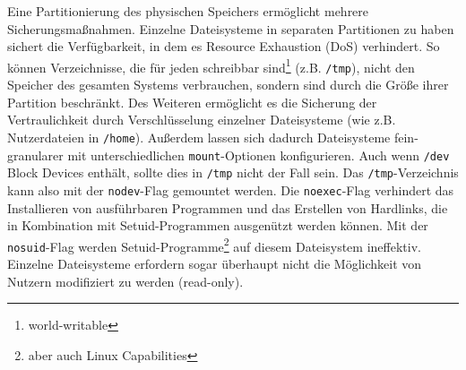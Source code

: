 Eine Partitionierung des physischen Speichers ermöglicht mehrere Sicherungsmaßnahmen.
Einzelne Dateisysteme in separaten Partitionen zu haben sichert die Verfügbarkeit, in dem es Resource Exhaustion (DoS) verhindert. So können Verzeichnisse, die für jeden schreibbar sind\footnote{world-writable} (z.B. \texttt{/tmp}), nicht den Speicher des gesamten Systems verbrauchen, sondern sind durch die Größe ihrer Partition beschränkt.
Des Weiteren ermöglicht es die Sicherung der Vertraulichkeit durch Verschlüsselung einzelner Dateisysteme (wie z.B. Nutzerdateien in \texttt{/home}).
Außerdem lassen sich dadurch Dateisysteme fein-granularer mit unterschiedlichen \texttt{mount}-Optionen konfigurieren. Auch wenn \texttt{/dev} Block Devices enthält, sollte dies in \texttt{/tmp} nicht der Fall sein. Das \texttt{/tmp}-Verzeichnis kann also mit der \texttt{nodev}-Flag gemountet werden. Die \texttt{noexec}-Flag verhindert das Installieren von ausführbaren Programmen und das Erstellen von Hardlinks, die in Kombination mit Setuid-Programmen ausgenützt werden können. Mit
der \texttt{nosuid}-Flag werden Setuid-Programme\footnote{aber auch Linux Capabilities} auf diesem Dateisystem ineffektiv. Einzelne Dateisysteme erfordern sogar überhaupt nicht die Möglichkeit von Nutzern modifiziert zu werden (read-only). \cite{cis, subgraph-oz}

\begin{table}[H]
\centering
{}
\end{table}


